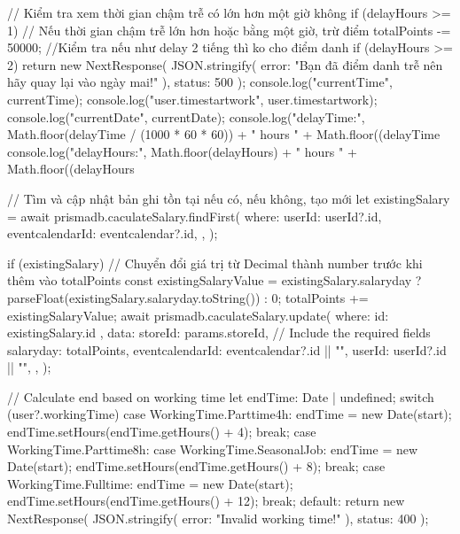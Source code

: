{{      // Kiểm tra xem thời gian chậm trễ có lớn hơn một giờ không
      if (delayHours >= 1) {
        // Nếu thời gian chậm trễ lớn hơn hoặc bằng một giờ, trừ điểm
        totalPoints -= 50000;
      }
      //Kiểm tra nếu như delay  2 tiếng thì ko cho điểm danh
      if (delayHours >= 2) {
        return new NextResponse(
          JSON.stringify({ error: "Bạn đã điểm danh trễ nên hãy quay lại vào ngày mai!" }),
          { status: 500 }
        );
      }
      console.log("currentTime", currentTime);
      console.log("user.timestartwork", user.timestartwork);
      console.log("currentDate", currentDate);
      console.log("delayTime:", Math.floor(delayTime / (1000 * 60 * 60)) + " hours " + Math.floor((delayTime %
      console.log("delayHours:", Math.floor(delayHours) + " hours " + Math.floor((delayHours %

    // Tìm và cập nhật bản ghi tồn tại nếu có, nếu không, tạo mới
    let existingSalary = await prismadb.caculateSalary.findFirst({
      where: {
        userId: userId?.id,
        eventcalendarId: eventcalendar?.id,
      },
    });

    if (existingSalary) {
      // Chuyển đổi giá trị từ Decimal thành number trước khi thêm vào totalPoints
      const existingSalaryValue = existingSalary.salaryday
        ? parseFloat(existingSalary.salaryday.toString())
        : 0;
      totalPoints += existingSalaryValue;
      await prismadb.caculateSalary.update({
        where: { id: existingSalary.id },
        data: {
          storeId: params.storeId, // Include the required fields
          salaryday: totalPoints,
          eventcalendarId: eventcalendar?.id || "",
          userId: userId?.id || "",
        },
      });
    }

    // Calculate end based on working time
    let endTime: Date | undefined;
    switch (user?.workingTime) {
      case WorkingTime.Parttime4h:
        endTime = new Date(start);
        endTime.setHours(endTime.getHours() + 4);
        break;
      case WorkingTime.Parttime8h:
      case WorkingTime.SeasonalJob:
        endTime = new Date(start);
        endTime.setHours(endTime.getHours() + 8);
        break;
      case WorkingTime.Fulltime:
        endTime = new Date(start);
        endTime.setHours(endTime.getHours() + 12);
        break;
      default:
        return new NextResponse(
          JSON.stringify({ error: "Invalid working time!" }),
          { status: 400 }
        );
    }

}}
